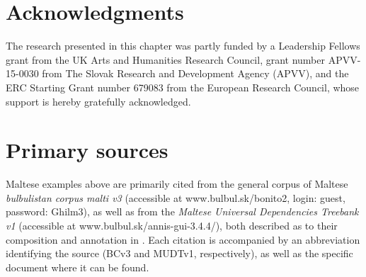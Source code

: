 \documentclass[output=paper]{langsci/langscibook}
\begin{document}
\section*{Acknowledgments}
The research presented in this chapter was partly funded by a Leadership Fellows grant from the UK Arts and Humanities Research Council, grant number APVV-15-0030 from The Slovak Research and Development Agency (APVV), and the ERC Starting Grant number 679083 from the European Research Council, whose support is hereby gratefully acknowledged.

\section*{Primary sources}
Maltese examples above are primarily cited from the general corpus of Maltese \textit{bulbulistan corpus malti v3} (accessible at www.bulbul.sk/bonito2, login: guest, password: Ghilm3), as well as from the \textit{Maltese Universal Dependencies Treebank v1} (accessible at www.bulbul.sk/annis-gui-3.4.4/), both described as to their composition and annotation in \cite{bulbul2018}. Each citation is accompanied by an abbreviation identifying the source (BCv3 and MUDTv1, respectively), as well as the specific document where it can be found.

\printbibliography[heading=subbibliography,notkeyword=this]
\end{document}
